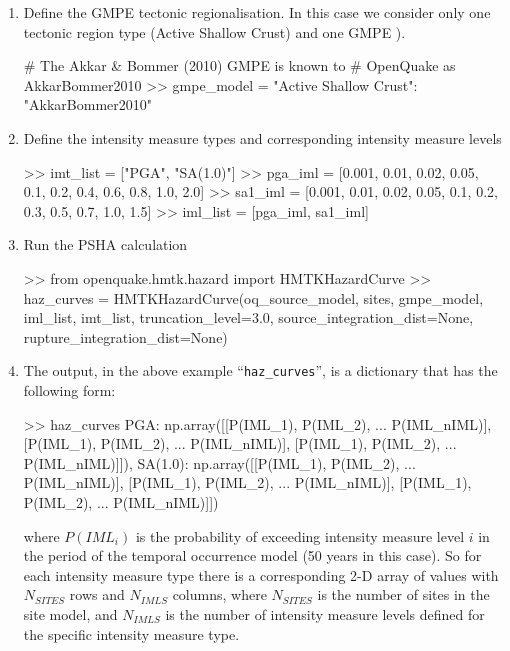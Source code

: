 \begin{enumerate}
\item Define the GMPE tectonic regionalisation. In this case we consider only one tectonic region type (Active Shallow Crust) and one GMPE \parencite{akkar2010}). 

\begin{python}[frame=single]
# The Akkar & Bommer (2010) GMPE is known to 
# OpenQuake as AkkarBommer2010
>> gmpe_model = {"Active Shallow Crust": "AkkarBommer2010"}
\end{python}

\item Define the intensity measure types and corresponding intensity measure levels

\begin{python}[frame=single]
>> imt_list = ["PGA", "SA(1.0)"]
>> pga_iml = [0.001, 0.01, 0.02, 0.05, 0.1, 
                    0.2, 0.4, 0.6, 0.8, 1.0, 2.0]
>> sa1_iml = [0.001, 0.01, 0.02, 0.05, 0.1,
                    0.2, 0.3, 0.5, 0.7, 1.0, 1.5]
>> iml_list = [pga_iml, sa1_iml]
\end{python}

\item Run the PSHA calculation

\begin{python}[frame=single]
>> from openquake.hmtk.hazard import HMTKHazardCurve
>> haz_curves = HMTKHazardCurve(oq_source_model,
                                sites,
                                gmpe_model,
                                iml_list,
                                imt_list,
                                truncation_level=3.0,
                                source_integration_dist=None,
                                rupture_integration_dist=None)
\end{python}

\item The output, in the above example ``\verb=haz_curves='', is a dictionary that has the following form:

\begin{python}[frame=single]

>> haz_curves
{PGA: np.array([[P(IML_1), P(IML_2), ... P(IML_nIML)],
                [P(IML_1), P(IML_2), ... P(IML_nIML)],
                [P(IML_1), P(IML_2), ... P(IML_nIML)]]),
SA(1.0): np.array([[P(IML_1), P(IML_2), ... P(IML_nIML)],
                   [P(IML_1), P(IML_2), ... P(IML_nIML)],
                   [P(IML_1), P(IML_2), ... P(IML_nIML)]])}
\end{python}

where $P(IML_i)$ is the probability of exceeding intensity measure level $i$ in the period of the temporal occurrence model (50 years in this case). So for each intensity measure type there is a corresponding 2-D array of values with $N_{SITES}$ rows and $N_{IMLS}$ columns, where $N_{SITES}$ is the number of sites in the site model, and $N_{IMLS}$ is the number of intensity measure levels defined for the specific intensity measure type.

\end{enumerate}

